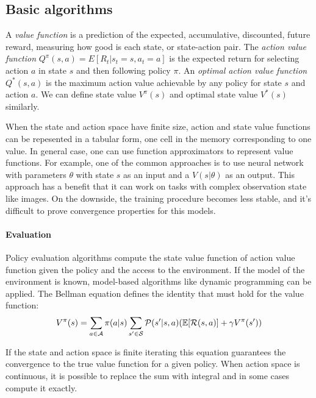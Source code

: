 
\subsection{Basic algorithms}

A \emph{value function} is a prediction of the expected, accumulative, discounted, future reward, measuring how
good is each state, or state-action pair.
The \emph{action value function} $Q^{\pi}(s, a) = E[R_t | s_t = s, a_t = a]$ is the expected return for
selecting action $a$ in state $s$ and then following policy $\pi$.
An \emph{optimal action value function} $Q^{*}(s, a)$ is the maximum action value achievable by any policy for
state $s$ and action $a$. We can define state value $V^{\pi}(s)$ and optimal state value $V^{*}(s)$ similarly.

When the state and action space have finite size, action and state value functions can be
repesented in a tabular form, one cell in the memory corresponding to one value. In general case,
one can use function approximators to represent value functions. For example, one of the
common approaches is to use neural network with parameters $\theta$ with state $s$ as an input and
a $V(s|\theta)$ as an output. This approach has a benefit that it can work on tasks with complex
observation state like images. On the downside, the training procedure becomes less stable, and
it's difficult to prove convergence properties for this models.

\paragraph{Evaluation}
Policy evaluation algorithms compute the state value function of action value function given the policy and the access to the environment. If the model of the environment is known, model-based algorithms like dynamic programming can be applied. The Bellman equation defines the identity that must hold for the value function:
\begin{align*}
    V^{\pi}(s) = \sum_{a \in \mathcal{A}} \pi(a|s) \sum_{s' \in \mathcal{S}} \mathcal{P}(s'|s, a)
    (\mathbb{E}[\mathcal{R}(s, a)] + \gamma V^{\pi} (s'))
\end{align*}

If the state and action space is finite iterating this equation guarantees the convergence to the true value function
for a given policy. When action space is continuous, it is possible to replace the sum with integral and in some cases compute it exactly.

